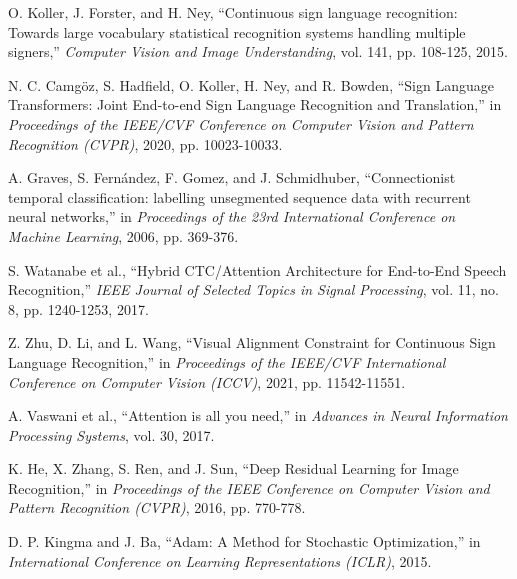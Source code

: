 \documentclass[12pt,a4paper]{article}
\begin{document}
\begin{enumerate}[label={[\arabic*]}, leftmargin=*, noitemsep]
    \item O. Koller, J. Forster, and H. Ney, ``Continuous sign language recognition: Towards large vocabulary statistical recognition systems handling multiple signers,'' \textit{Computer Vision and Image Understanding}, vol. 141, pp. 108-125, 2015.
    
    \item N. C. Camgöz, S. Hadfield, O. Koller, H. Ney, and R. Bowden, ``Sign Language Transformers: Joint End-to-end Sign Language Recognition and Translation,'' in \textit{Proceedings of the IEEE/CVF Conference on Computer Vision and Pattern Recognition (CVPR)}, 2020, pp. 10023-10033.
    
    \item A. Graves, S. Fernández, F. Gomez, and J. Schmidhuber, ``Connectionist temporal classification: labelling unsegmented sequence data with recurrent neural networks,'' in \textit{Proceedings of the 23rd International Conference on Machine Learning}, 2006, pp. 369-376.
    
    \item S. Watanabe et al., ``Hybrid CTC/Attention Architecture for End-to-End Speech Recognition,'' \textit{IEEE Journal of Selected Topics in Signal Processing}, vol. 11, no. 8, pp. 1240-1253, 2017.
    
    \item Z. Zhu, D. Li, and L. Wang, ``Visual Alignment Constraint for Continuous Sign Language Recognition,'' in \textit{Proceedings of the IEEE/CVF International Conference on Computer Vision (ICCV)}, 2021, pp. 11542-11551.
    
    \item A. Vaswani et al., ``Attention is all you need,'' in \textit{Advances in Neural Information Processing Systems}, vol. 30, 2017.
    
    \item K. He, X. Zhang, S. Ren, and J. Sun, ``Deep Residual Learning for Image Recognition,'' in \textit{Proceedings of the IEEE Conference on Computer Vision and Pattern Recognition (CVPR)}, 2016, pp. 770-778.
    
    \item D. P. Kingma and J. Ba, ``Adam: A Method for Stochastic Optimization,'' in \textit{International Conference on Learning Representations (ICLR)}, 2015.
\end{enumerate}

\vspace{1cm}
\end{document}
